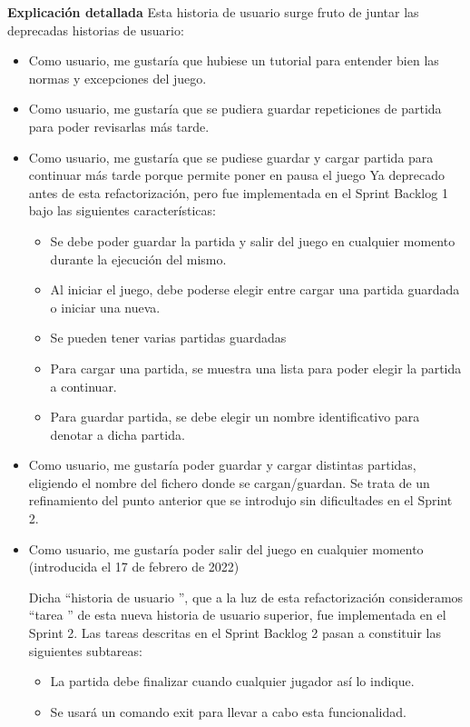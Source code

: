 \documentclass[../../SCRUM.tex]{subfiles}
\begin{document}
\textbf{Explicación detallada}
Esta historia de usuario surge fruto de juntar las deprecadas historias de usuario:
\begin{itemize}
\item  Como usuario, me gustaría que hubiese un tutorial para entender bien las normas y excepciones del juego. 

\item  Como usuario, me gustaría que se pudiera guardar repeticiones de partida para poder revisarlas más tarde. 

\item  Como usuario, me gustaría que se pudiese guardar y cargar partida para continuar más tarde porque permite poner en pausa el juego 
    Ya deprecado antes de esta refactorización, pero fue implementada en el Sprint Backlog 1 bajo las siguientes características:
    \begin{itemize}
    \item Se debe poder guardar la partida y salir del juego en cualquier momento durante la ejecución del mismo.
     \item Al iniciar el juego, debe poderse elegir entre cargar una partida guardada o iniciar una nueva.
     \item Se pueden tener varias partidas guardadas
     \item Para cargar una partida, se muestra una lista para poder elegir la partida a continuar.
     \item Para guardar partida, se debe elegir un nombre identificativo para denotar a dicha partida.
    \end{itemize}
\item  Como usuario, me gustaría poder guardar y cargar distintas partidas, eligiendo el nombre del fichero donde se cargan/guardan. 
    Se trata de un refinamiento del punto anterior que se introdujo sin dificultades en el Sprint 2.
    
\item  Como usuario, me gustaría poder salir del juego en cualquier momento (introducida el 17 de febrero de 2022) 

    Dicha  ``historia de usuario '', que a la luz de esta refactorización consideramos  ``tarea '' de esta nueva historia de usuario superior, fue implementada en el Sprint 2. Las tareas descritas en el Sprint Backlog 2 pasan a constituir las siguientes subtareas:
    \begin{itemize}
    \item La partida debe finalizar cuando cualquier jugador así lo indique.
    \item Se usará un comando  exit  para llevar a cabo esta funcionalidad.
    \end{itemize}
\end{itemize}

\end{document}
